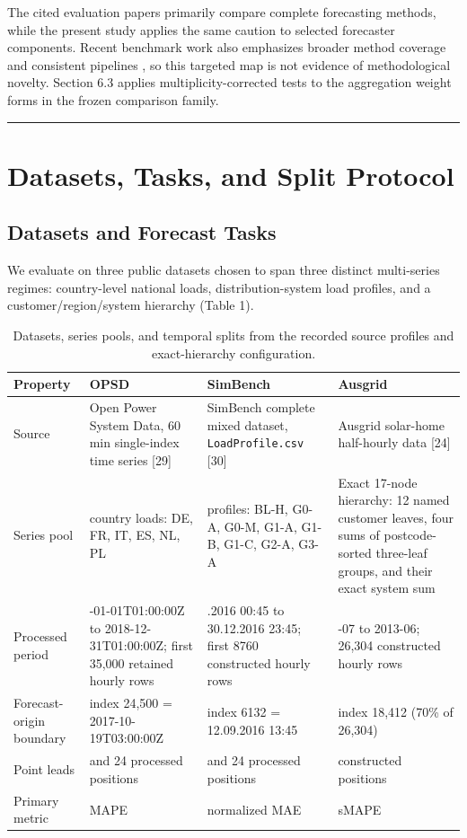 \documentclass[electronics,article,submit,moreauthors]{Definitions/mdpi}
\begin{document}
The cited evaluation papers primarily compare complete forecasting methods, while the present study applies the same caution to selected forecaster components. Recent benchmark work also emphasizes broader method coverage and consistent pipelines \cite{ref33}, so this targeted map is not evidence of methodological novelty. Section 6.3 applies multiplicity-corrected tests to the aggregation weight forms in the frozen comparison family.

\begin{center}\rule{0.5\linewidth}{0.5pt}\end{center}

\section{Datasets, Tasks, and Split Protocol}\label{datasets-tasks-and-split-protocol}

\subsection{Datasets and Forecast Tasks}\label{datasets-and-forecast-tasks}

We evaluate on three public datasets chosen to span three distinct multi-series regimes: country-level national loads, distribution-system load profiles, and a customer/region/system hierarchy (Table 1).

\begin{table}[t]
\centering
\footnotesize
\setlength{\tabcolsep}{3pt}
\caption{Datasets, series pools, and temporal splits from the recorded source profiles and exact-hierarchy configuration.}\label{tab:1}
\begin{tabularx}{\textwidth}{@{}>{\raggedright\arraybackslash}X >{\raggedright\arraybackslash}X >{\raggedright\arraybackslash}X >{\raggedright\arraybackslash}X@{}}
\toprule
Property & OPSD & SimBench & Ausgrid \\
\midrule
Source & Open Power System Data, 60 min single-index time series [29] & SimBench complete mixed dataset, \texttt{LoadProfile.csv} [30] & Ausgrid solar-home half-hourly data [24] \\
Series pool & 6 country loads: DE, FR, IT, ES, NL, PL & 8 profiles: BL-H, G0-A, G0-M, G1-A, G1-B, G1-C, G2-A, G3-A & Exact 17-node hierarchy: 12 named customer leaves, four sums of postcode-sorted three-leaf groups, and their exact system sum \\
Processed period & 2015-01-01T01:00:00Z to 2018-12-31T01:00:00Z; first 35,000 retained hourly rows & 01.01.2016 00:45 to 30.12.2016 23:45; first 8760 constructed hourly rows & 2010-07 to 2013-06; 26,304 constructed hourly rows \\
Forecast-origin boundary & index 24,500 = 2017-10-19T03:00:00Z & index 6132 = 12.09.2016 13:45 & index 18,412 (70\% of 26,304) \\
Point leads & 1 and 24 processed positions & 1 and 24 processed positions & 24 constructed positions \\
Primary metric & MAPE & normalized MAE & sMAPE \\
\bottomrule
\end{tabularx}
\end{table}
\end{document}
